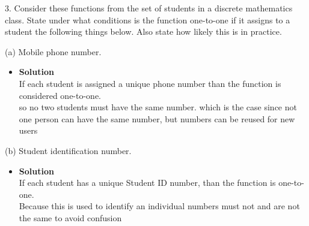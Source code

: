 \documentclass[11pt]{article}
\begin{document}





\begin{enumerate}

\begin{flushleft}
{\large 3. Consider these functions from the set of students in a discrete mathematics class. State under what
conditions is the function one-to-one if it assigns to a student the following things below. Also state
how likely this is in practice.}\\
\end{flushleft}



\large (a) Mobile phone number.\\

\begin{itemize}
\item \textbf{Solution}\\
\large If each student is assigned a unique phone number than the function is considered one-to-one.\\
\large so no two students must have the same number.
\large which is the case since not one person can have the same number, but numbers can be reused for new users\\


\end {itemize}
\end {enumerate}

\begin{enumerate}
\begin{flushleft}
\end{flushleft}


\large (b) Student identification number.\\

\begin{itemize}
\item \textbf{Solution}\\
\large If each student has a unique Student ID number, than the function is one-to-one.\\
\large  Because this is used to identify an individual numbers must not and are not the same to avoid confusion\\


\end {itemize}
\end {enumerate}
\end{document}

